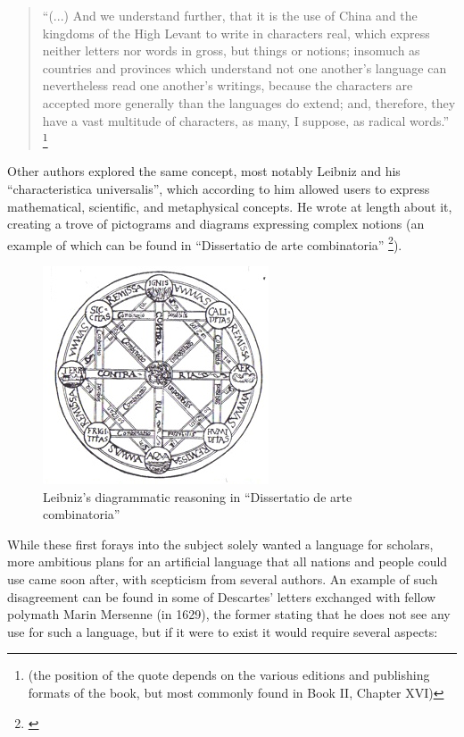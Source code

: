 \begin{quote}
    ``(...) And we understand further, that it is the use of China and the kingdoms of the High Levant to write in characters real, which express neither letters nor words in gross, but
    things or notions; insomuch as countries and provinces which understand not one another’s language can nevertheless read one another’s writings, because the characters are accepted
    more generally than the languages do extend; and, therefore, they have a vast multitude of characters, as many, I suppose, as radical words.''
    \footnote{\cite{bacon1605proficience} (the position of the quote depends on the various editions and publishing formats of the book, but most commonly found in Book II, Chapter XVI)}
\end{quote}

Other authors explored the same concept, most notably Leibniz and his ``characteristica universalis'', which according to him allowed users to express mathematical, scientific, and metaphysical
concepts. He wrote at length about it, creating a trove of pictograms and diagrams expressing complex notions (an example of which can be found in
``Dissertatio de arte combinatoria'' \footnote{\cite{leibniz1666dissertatio}}).

\begin{figure}[H]
\centering
\includegraphics[scale=0.9]{images/characteristica_universalis_diagram.jpg}
\caption{Leibniz's diagrammatic reasoning in ``Dissertatio de arte combinatoria''}
\end{figure}

\newpage
While these first forays into the subject solely wanted a language for scholars, more ambitious plans for an artificial language that all nations and people could use came soon after,
with scepticism from several authors. An example of such disagreement can be found in some of Descartes' letters exchanged with fellow polymath Marin Mersenne (in 1629), the former
stating that he does not see any use for such a language, but if it were to exist it would require several aspects:

